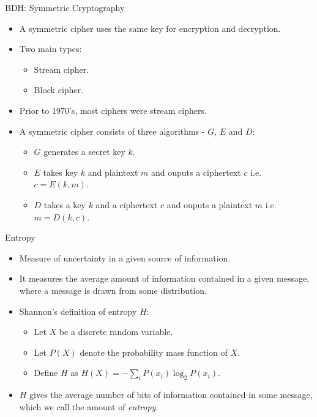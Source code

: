 \documentclass[presentation]{beamer}
\begin{document}
\begin{frame}[label=sec-3]{BDH: Symmetric Cryptography}
\begin{itemize}
\item A symmetric cipher uses the same key for encryption and decryption.
\item Two main types:
\begin{itemize}
\item Stream cipher.
\item Block cipher.
\end{itemize}
\item Prior to 1970's, most ciphers were stream ciphers.
\item A symmetric cipher consists of three algorithms - $G$, $E$ and $D$:
\begin{itemize}
\item $G$ generates a secret key $k$.
\item $E$ takes key $k$ and plaintext $m$ and ouputs a ciphertext $c$ i.e. $c = E(k, m)$.
\item $D$ takes a key $k$ and a ciphertext $c$ and ouputs a plaintext $m$ i.e. $m = D(k, c)$.
\end{itemize}
\end{itemize}
\end{frame}
\begin{frame}[label=sec-4]{Entropy}
\begin{itemize}[<+->]
\item Measure of uncertainty in a given source of information.
\item It measures the average amount of information contained in a given message, where a message is drawn from some distribution.
\item Shannon's definition of entropy $H$:
\begin{itemize}
\item Let $X$ be a discrete random variable.
\item Let $P(X)$ denote the probability mass function of $X$.
\item Define $H$ as $H(X) = -\sum_{i} P(x_i) \log_2{P(x_i)}$.
\end{itemize}
\item $H$ gives the average number of bits of information contained in some message, which we call the amount of \emph{entropy}.
\end{itemize}
\end{frame}
\end{document}
